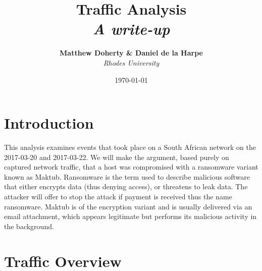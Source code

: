 \documentclass[11pt]{diazessay} %
\title{\textbf{Traffic Analysis} \\ {\Large\itshape A write-up}} %
\author{\textbf{Matthew Doherty \& Daniel de la Harpe} \\ \textit{Rhodes University}} %
\date{\today} %
\begin{document}
\maketitle %



\renewcommand{\thesection}{\arabic{section}}
\renewcommand{\thesubsection}{\arabic{subsection}}
\renewcommand{\thesubsubsection}{\arabic{subsubsection}}
\renewcommand{\thesubsection}{\thesection.\arabic{subsection}}
\renewcommand{\thesubsubsection}{\thesubsection.\arabic{subsubsection}}

\vspace{30pt} %



\section{Introduction}
This analysis examines events that took place on a South African network on the 2017-03-20 and 2017-03-22. We will make the argument, based purely on captured network traffic, that a host was compromised with a ransomware variant known as Maktub. Ransomware is the term used to describe malicious software that either encrypts data (thus denying access), or threatens to leak data. The attacker will offer to stop the attack if payment is received thus the name ransomware. Maktub is of the encryption variant and is usually delivered via an email attachment, which appears legitimate but performs its malicious activity in the background.




\section{Traffic Overview}
\end{document}
